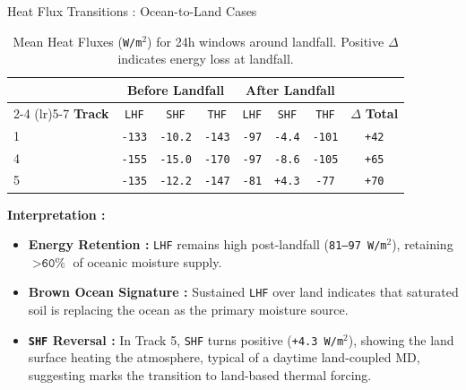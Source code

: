 \documentclass[8pt, aspectratio=169]{beamer}
\begin{document}
\begin{frame}{Heat Flux Transitions : Ocean-to-Land Cases}
    \begin{table}[H]
        \footnotesize
        \centering
        \caption{Mean Heat Fluxes (\texttt{W/m$^2$}) for 24h windows around landfall. Positive $\Delta$ indicates energy loss at landfall.}
        \begin{tabular}{lccccccc}
            \toprule
                           & \multicolumn{3}{c}{\textbf{Before Landfall}} & \multicolumn{3}{c}{\textbf{After Landfall}} &                \\
            \cmidrule(lr){2-4} \cmidrule(lr){5-7}
            \textbf{Track} & \texttt{LHF} & \texttt{SHF} & \texttt{THF} & \texttt{LHF} & \texttt{SHF} & \texttt{THF} & $\Delta$ \textbf{Total} \\
            \midrule
            1              & \texttt{-133} & \texttt{-10.2} & \texttt{-143} & \texttt{-97} & \texttt{-4.4} & \texttt{-101} & \texttt{+42} \\
            4              & \texttt{-155} & \texttt{-15.0} & \texttt{-170} & \texttt{-97} & \texttt{-8.6} & \texttt{-105} & \texttt{+65} \\
            5              & \texttt{-135} & \texttt{-12.2} & \texttt{-147} & \texttt{-81} & \texttt{+4.3} & \texttt{-77}  & \texttt{+70} \\
            \bottomrule
        \end{tabular}
    \end{table}

    \vspace{0.2cm}
    \footnotesize
    \textbf{Interpretation :}
    \begin{itemize}
        \item \textbf{Energy Retention :} \texttt{LHF} remains high post-landfall (\texttt{81--97 W/m$^2$}), retaining $>\texttt{60\%}$ of oceanic moisture supply.
        \item \textbf{Brown Ocean Signature :} Sustained \texttt{LHF} over land indicates that saturated soil is replacing the ocean as the primary moisture source.
        \item \textbf{\texttt{SHF} Reversal :} In Track 5, \texttt{SHF} turns positive (\texttt{+4.3 W/m$^2$}), showing the land surface heating the atmosphere, typical of a daytime land-coupled MD, suggesting marks the transition to land-based thermal forcing.
    \end{itemize}
\end{frame}
\end{document}
